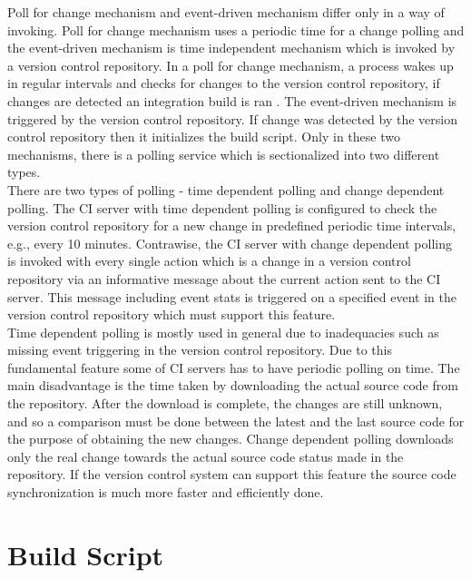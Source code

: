 Poll for change mechanism and event-driven mechanism differ only in a way of invoking. Poll for change mechanism uses a periodic time for a change polling and the event-driven mechanism is time independent mechanism which is invoked by a version control repository. In a poll for change mechanism, a process wakes up in regular intervals and checks for changes to the version control repository, if changes are detected an integration build is ran \cite{CIbook}. The event-driven mechanism is triggered by the version control repository. If change was detected by the version control repository then it initializes the build script. Only in these two mechanisms, there is a polling service which is sectionalized into two different types.\\

There are two types of polling - time dependent polling and change dependent polling. The CI server with time dependent polling is configured to check the version control repository for a new change in predefined periodic time intervals, e.g., every 10 minutes. Contrawise, the CI server with change dependent polling is invoked with every single action which is a change in a version control repository via an informative message about the current action sent to the CI server. This message including event stats is triggered on a specified event in the version control repository which must support this feature.\\

Time dependent polling is mostly used in general due to inadequacies such as missing event triggering in the version control repository. Due to this fundamental feature some of CI servers has to have  periodic polling on time. The main disadvantage is the time taken by downloading the actual source code from the repository. After the download is complete, the changes are still unknown, and so a comparison must be done between the latest and the last source code for the purpose of obtaining the new changes. Change dependent polling downloads only the real change towards the actual source code status made in the repository. If the version control system can support this feature the source code synchronization is much more faster and efficiently done.

\section{Build Script}\label{build_script}

